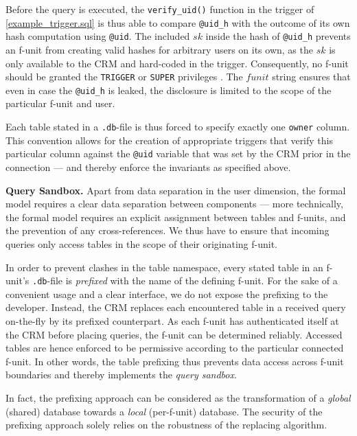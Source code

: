 \documentclass{src/acm_proc_article-sp} \else
\newcommand\myparagraph[1]{\medskip\noindent\textbf{#1.}}
\begin{document}
Before the query is executed, the \texttt{verify\_uid()} function in
the trigger of \autoref{example_trigger.sql} is thus able to compare
\texttt{@uid\_h} with the outcome of its own hash computation using
\texttt{@uid}. The included $\mathit{sk}$ inside the hash of
\texttt{@uid\_h} prevents an f-unit from creating valid hashes for
arbitrary users on its own, as the $\mathit{sk}$ is only available to
the CRM and hard-coded in the trigger. Consequently, no f-unit should
be granted the \texttt{TRIGGER} or \texttt{SUPER} privileges
\cite{mysql-show-triggers}. The $\mathit{funit}$ string ensures that
even in case the \texttt{@uid\_h} is leaked, the disclosure is
limited to the scope of the particular f-unit and user.

Each table stated in a \texttt{.db}-file is thus forced to specify
exactly one \texttt{owner} column. This convention allows for the
creation of appropriate triggers that verify this particular column
against the \texttt{@uid} variable that was set by the CRM prior in
the connection --- and thereby enforce the invariants as specified
above.

\myparagraph{Query Sandbox}
Apart from data separation in the user dimension, the formal model
requires a clear data separation between components --- more
technically, the formal model requires an explicit assignment between
tables and f-units, and the prevention of any cross-references. We
thus have to ensure that incoming queries only access tables in the
scope of their originating f-unit.

In order to prevent clashes in the table namespace, every stated
table in an f-unit's \texttt{.db}-file is \emph{prefixed} with the
name of the defining f-unit. For the sake of a convenient usage and a
clear interface, we do not expose the prefixing to the developer.
Instead, the CRM replaces each encountered table in a received query
on-the-fly by its prefixed counterpart. As each f-unit has
authenticated itself at the CRM before placing queries, the f-unit
can be determined reliably. Accessed tables are hence enforced to be
permissive according to the particular connected f-unit. In other
words, the table prefixing thus prevents data access across f-unit
boundaries and thereby implements the \emph{query sandbox}.

In fact, the prefixing approach can be considered as the
transformation of a \emph{global} (shared) database towards a
\emph{local} (per-f-unit) database. The security of the prefixing
approach solely relies on the robustness of the replacing algorithm.
\end{document}
